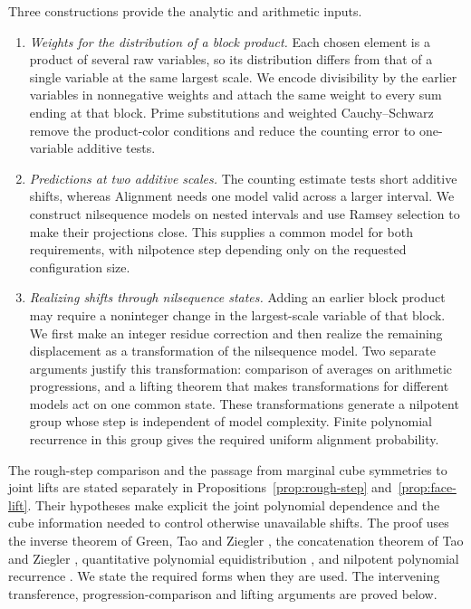Three constructions provide the analytic and arithmetic inputs.
\begin{enumerate}
\item \emph{Weights for the distribution of a block product.}
Each chosen element is a product of several raw variables, so its
distribution differs from that of a single variable at the same largest
scale. We encode divisibility by the earlier variables in nonnegative
weights and attach the same weight to every sum ending at that block.
Prime substitutions and weighted Cauchy--Schwarz remove the product-color
conditions and reduce the counting error to one-variable additive tests.

\item \emph{Predictions at two additive scales.}
The counting estimate tests short additive shifts, whereas Alignment
needs one model valid across a larger interval. We construct nilsequence
models on nested intervals and use Ramsey selection to make their
projections close. This supplies a common model for both requirements,
with nilpotence step depending only on the requested configuration size.

\item \emph{Realizing shifts through nilsequence states.}
Adding an earlier block product may require a noninteger change in the
largest-scale variable of that block. We first make an integer residue correction and then
realize the remaining displacement as a transformation of the
nilsequence model. Two separate arguments justify this transformation:
comparison of averages on arithmetic progressions, and a lifting theorem
that makes transformations for different models act on one common state.
These transformations generate a nilpotent group whose step is independent
of model complexity. Finite polynomial recurrence in this group gives
the required uniform alignment probability.
\end{enumerate}

The rough-step comparison and the passage from marginal cube symmetries
to joint lifts are stated separately in
Propositions~\ref{prop:rough-step} and~\ref{prop:face-lift}. Their
hypotheses make explicit the joint polynomial dependence and the
cube information needed to control otherwise unavailable shifts.
The proof uses the inverse theorem of Green, Tao and Ziegler
\cite{GTZ,GTZErratum}, the concatenation theorem of Tao and Ziegler
\cite{TaoZiegler}, quantitative polynomial equidistribution
\cite{GreenTao,GreenTaoErratum}, and nilpotent polynomial recurrence
\cite{ZorinKranich}. We state the required forms when they are used.
The intervening transference, progression-comparison and lifting
arguments are proved below.

